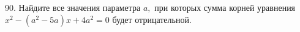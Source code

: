 90. Найдите все значения параметра $a,$ при которых сумма корней уравнения $x^2-(a^2-5a)x+4a^2=0$ будет отрицательной.\\
